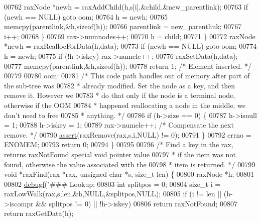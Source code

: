 \begin{DoxyCode}
{{{{{{{{{{{00762             raxNode *newh = raxAddChild(h,s[i],&child,&new\_parentlink);
00763             \textcolor{keywordflow}{if} (newh == NULL) \textcolor{keywordflow}{goto} oom;
00764             h = newh;
00765             memcpy(parentlink,&h,\textcolor{keyword}{sizeof}(h));
00766             parentlink = new\_parentlink;
00767             i++;
00768         \}
00769         rax->numnodes++;
00770         h = child;
00771     \}
00772     raxNode *newh = raxReallocForData(h,data);
00773     \textcolor{keywordflow}{if} (newh == NULL) \textcolor{keywordflow}{goto} oom;
00774     h = newh;
00775     \textcolor{keywordflow}{if} (!h->iskey) rax->numele++;
00776     raxSetData(h,data);
00777     memcpy(parentlink,&h,\textcolor{keyword}{sizeof}(h));
00778     \textcolor{keywordflow}{return} 1; \textcolor{comment}{/* Element inserted. */}
00779 
00780 oom:
00781     \textcolor{comment}{/* This code path handles out of memory after part of the sub-tree was}
00782 \textcolor{comment}{     * already modified. Set the node as a key, and then remove it. However we}
00783 \textcolor{comment}{     * do that only if the node is a terminal node, otherwise if the OOM}
00784 \textcolor{comment}{     * happened reallocating a node in the middle, we don't need to free}
00785 \textcolor{comment}{     * anything. */}
00786     \textcolor{keywordflow}{if} (h->size == 0) \{
00787         h->isnull = 1;
00788         h->iskey = 1;
00789         rax->numele++; \textcolor{comment}{/* Compensate the next remove. */}
00790         \hyperlink{redisassert_8h_a993abaa2c168852c1592879472938781}{assert}(raxRemove(rax,s,i,NULL) != 0);
00791     \}
00792     errno = ENOMEM;
00793     \textcolor{keywordflow}{return} 0;
00794 \}
00795 
00796 \textcolor{comment}{/* Find a key in the rax, returns raxNotFound special void pointer value}
00797 \textcolor{comment}{ * if the item was not found, otherwise the value associated with the}
00798 \textcolor{comment}{ * item is returned. */}
00799 \textcolor{keywordtype}{void} *raxFind(rax *rax, \textcolor{keywordtype}{unsigned} \textcolor{keywordtype}{char} *s, size\_t len) \{
00800     raxNode *h;
00801 
00802     \hyperlink{rax_8c_a10b215c81aa397dbc44adfb3e436befb}{debugf}(\textcolor{stringliteral}{"### Lookup: %
00803     \textcolor{keywordtype}{int} splitpos = 0;
00804     size\_t i = raxLowWalk(rax,s,len,&h,NULL,&splitpos,NULL);
00805     \textcolor{keywordflow}{if} (i != len || (h->iscompr && splitpos != 0) || !h->iskey)
00806         \textcolor{keywordflow}{return} raxNotFound;
00807     \textcolor{keywordflow}{return} raxGetData(h);
}}}}}}}}}}}}
\end{DoxyCode}
